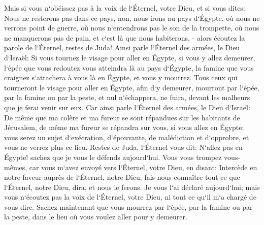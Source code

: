 \verse Mais si vous n`obéissez pas à la voix de l`Éternel, votre Dieu, 
\verse et si vous dites: Nous ne resterons pas dans ce pays, non, nous irons au pays d`Égypte, où nous ne verrons point de guerre, où nous n`entendrons pas le son de la trompette, où nous ne manquerons pas de pain, et c`est là que nous habiterons, - 
\verse alors écoutez la parole de l`Éternel, restes de Juda! Ainsi parle l`Éternel des armées, le Dieu d`Israël: Si vous tournez le visage pour aller en Égypte, si vous y allez demeurer, 
\verse l`épée que vous redoutez vous atteindra là au pays d`Égypte, la famine que vous craignez s`attachera à vous là en Égypte, et vous y mourrez. 
\verse Tous ceux qui tourneront le visage pour aller en Égypte, afin d`y demeurer, mourront par l`épée, par la famine ou par la peste, et nul n`échappera, ne fuira, devant les malheurs que je ferai venir sur eux. 
\verse Car ainsi parle l`Éternel des armées, le Dieu d`Israël: De même que ma colère et ma fureur se sont répandues sur les habitants de Jérusalem, de même ma fureur se répandra sur vous, si vous allez en Égypte; vous serez un sujet d`exécration, d`épouvante, de malédiction et d`opprobre, et vous ne verrez plus ce lieu. 
\verse Restes de Juda, l`Éternel vous dit: N`allez pas en Égypte! sachez que je vous le défends aujourd`hui. 
\verse Vous vous trompez vous-mêmes, car vous m`avez envoyé vers l`Éternel, votre Dieu, en disant: Intercède en notre faveur auprès de l`Éternel, notre Dieu, fais-nous connaître tout ce que l`Éternel, notre Dieu, dira, et nous le ferons. 
\verse Je vous l`ai déclaré aujourd`hui; mais vous n`écoutez pas la voix de l`Éternel, votre Dieu, ni tout ce qu`il m`a chargé de vous dire. 
\verse Sachez maintenant que vous mourrez par l`épée, par la famine ou par la peste, dans le lieu où vous voulez aller pour y demeurer. 

